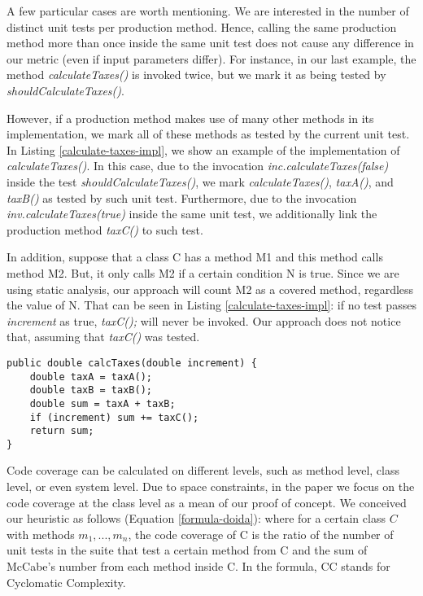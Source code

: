 \documentclass{sig-alternate}
\begin{document}
A few particular cases are worth mentioning. We are interested in the number 
of distinct unit tests per production method. Hence, calling the same production method
more than once inside the same unit test does not cause any difference in our metric 
(even if input parameters differ). For instance, in our last example, the 
method \textit{calculateTaxes()} is invoked twice, but we mark it 
as being tested by \textit{shouldCalculateTaxes()}.

However, if a production method makes use of many other methods in its implementation,
we mark all of these methods as tested by the current unit test. In Listing \ref{calculate-taxes-impl},
we show an example of the implementation of \textit{calculateTaxes()}. In this case, due to the 
invocation \textit{inc.calculateTaxes(false)} inside the test \textit{shouldCalculateTaxes()}, 
we mark \textit{calculateTaxes()}, \textit{taxA()}, and \textit{taxB()} as tested 
by such unit test. Furthermore, due to the invocation \textit{inv.calculateTaxes(true)} inside
the same unit test, we additionally link the production method \textit{taxC()} to such test.

In addition, suppose that a class C has a method M1 and this method calls method M2. But, it only calls M2 if a certain condition N is true. 
Since we are using static analysis, our approach will count M2 as a covered method, regardless the value of N. 
That can be seen in Listing \ref{calculate-taxes-impl}: if no test passes \textit{increment} as true,
\textit{taxC();} will never be invoked. Our approach does not notice that, 
assuming that \textit{taxC()} was tested.

\begin{lstlisting}
public double calcTaxes(double increment) {
	double taxA = taxA();
	double taxB = taxB();
	double sum = taxA + taxB;
	if (increment) sum += taxC();
	return sum;
}
\end{lstlisting}

Code coverage can be calculated on different levels, such as method level, class level, or even
system level. Due to space constraints, in the paper we focus on the code coverage at the class level as a mean of our proof of concept.
We conceived our heuristic as follows (Equation \ref{formula-doida}): where for a certain class $C$ with methods $m_1, ..., m_n$, the code coverage of C is the ratio of the number of unit tests in the suite that test a certain method from C and the sum of McCabe's number from each method inside C. In the formula, CC stands for Cyclomatic Complexity.
\end{document}

